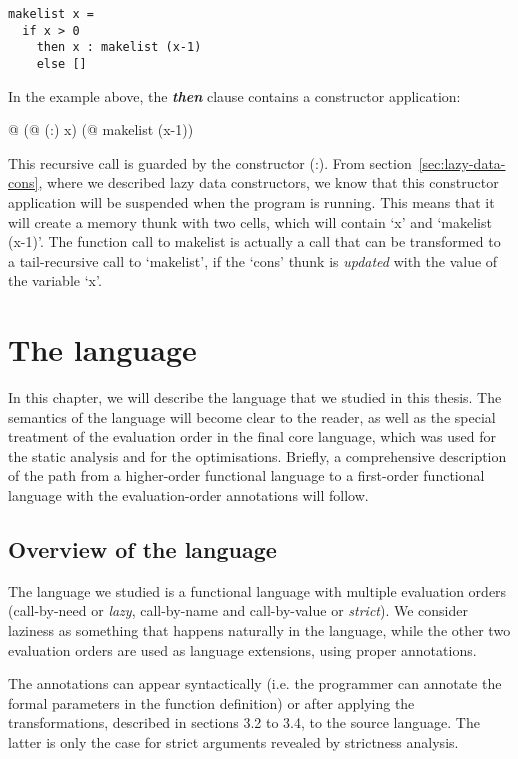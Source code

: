 \documentclass[diploma]{softlab-thesis}
\begin{document}
\begin{verbatim}
makelist x = 
  if x > 0 
    then x : makelist (x-1)
    else []
\end{verbatim}

In the example above, the \textbf{\textit{then}} clause contains a constructor 
application: 
\begin{center}
  @ (@ (:) x) (@ makelist (x-1))
\end{center}

This recursive call is guarded by the constructor (:).
From section~\ref{sec:lazy-data-cons}, where we described lazy data constructors,
we know that this constructor application will be suspended when 
the program is running. This means that it will create a memory 
thunk with two cells, which will contain `x' and `makelist (x-1)'.
The function call to makelist is actually a call that can be transformed 
to a tail-recursive call to `makelist', if the `cons' thunk is \textit{updated} 
with the value of the variable `x'. 

\chapter {The language}
\label{ch:language}

In this chapter, we will describe the language that we studied in this thesis.
The semantics of the language will become clear to the reader, as well as 
the special treatment of the evaluation order in the final core 
language, which was used for the static analysis and for the optimisations. Briefly, a 
comprehensive description of the path from a higher-order functional language 
to a first-order functional language with the evaluation-order annotations will follow.

\section {Overview of the language }
\label{sec:language-overview}

The language we studied is a functional language 
with multiple evaluation orders (call-by-need or 
\textit{lazy}, call-by-name and call-by-value or \textit{strict}).
We consider laziness as something that happens naturally in the language, while 
the other two evaluation orders are used as language extensions,
using proper annotations.

The annotations can appear syntactically (i.e. the programmer can annotate 
the formal parameters in the function definition) or 
after applying the transformations, described in sections 3.2 to 3.4, 
to the source language. The latter
is only the case for strict arguments revealed by strictness analysis.
\end{document}

